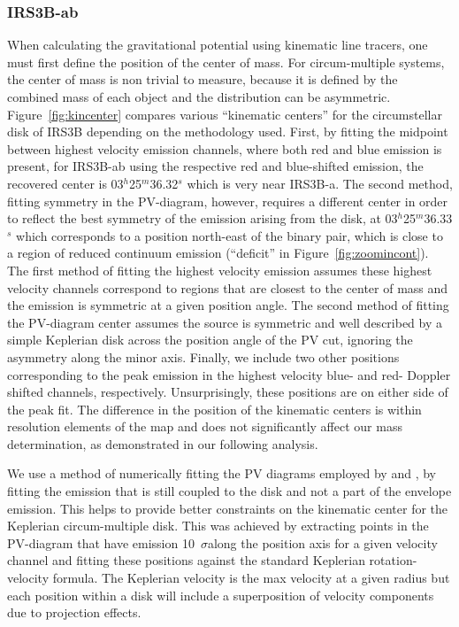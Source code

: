\documentclass[twocolumn, 12pt, trackchanges]{aastex63}
\begin{document}
\subsubsection{IRS3B-\lowercase{ab}}
When calculating the gravitational potential using kinematic line tracers, one must first define the position of the center of mass.  For circum-multiple systems, the center of mass is non trivial to measure, because it is defined by the combined mass of each object and the distribution can be asymmetric. Figure~\ref{fig:kincenter} compares various ``kinematic centers'' for the circumstellar disk of IRS3B depending on the methodology used. First, by fitting the midpoint between highest velocity \cso\space emission channels, where both red and blue emission is present, for IRS3B-ab using the respective red and blue-shifted emission, the recovered center is 03$^{h}$25$^{m}$36.32$^{s}$ which is very near IRS3B-a. The second method, fitting symmetry in the PV-diagram, however, requires a different center in order to reflect the best symmetry of the emission arising from the disk, at 03$^{h}$25$^{m}$36.33$^{s}$ which corresponds to a position north-east of the binary pair, which is close to a region of reduced continuum emission (``deficit'' in Figure~\ref{fig:zoomincont}). The first method of fitting the highest velocity emission assumes these highest velocity channels correspond to regions that are closest to the center of mass and the emission is symmetric at a given position angle.  The second method of fitting the PV-diagram center assumes the source is symmetric and well described by a simple Keplerian disk across the position angle of the PV cut, ignoring the asymmetry along the minor axis. Finally, we include two other positions corresponding to the peak emission in the highest velocity blue- and red- Doppler shifted channels, respectively.  Unsurprisingly, these positions are on either side of the peak fit. The difference in the position of the kinematic centers is within  resolution elements of the \cso\space map and does not significantly affect our mass determination, as demonstrated in our following analysis.

We use a method of numerically fitting the \cso\space PV diagrams employed by \citet[][]{2018ApJ...860..119G}\space and \citet[][]{2016MNRAS.459.1892S}, by fitting the emission that is still coupled to the disk and not a part of the envelope emission. This helps to provide better constraints on the kinematic center for the Keplerian circum-multiple disk. This was achieved by extracting points in the PV-diagram that have emission \deleted{\ab}10~$\sigma$\space along the position axis for a given velocity channel and fitting these positions against the standard Keplerian rotation-velocity formula. The Keplerian velocity is the max velocity at a given radius but each position within a disk will include a superposition of  velocity components due to projection effects.
\end{document}
